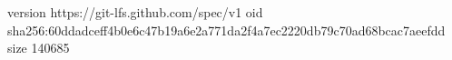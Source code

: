 version https://git-lfs.github.com/spec/v1
oid sha256:60ddadceff4b0e6c47b19a6e2a771da2f4a7ec2220db79c70ad68bcac7aeefdd
size 140685
